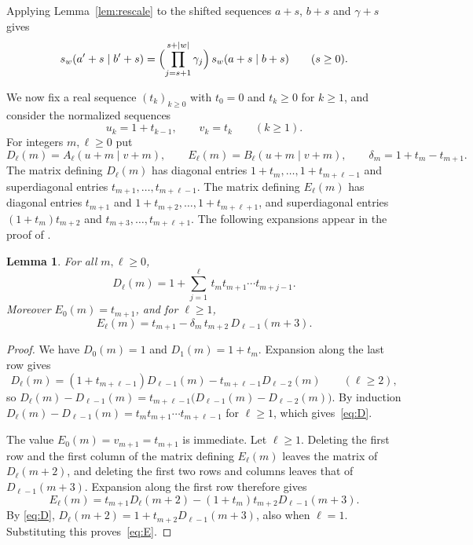 \documentclass[11pt]{amsart}
\newtheorem{lemma}[theorem]{Lemma}
\theoremstyle{definition}
\theoremstyle{remark}
\numberwithin{equation}{section}
\begin{document}
Applying Lemma~\ref{lem:rescale} to the shifted sequences $a+s$, $b+s$ and $\gamma+s$ gives
\begin{equation}\label{eq:rescale-shift}
s_w(a'+s\mid b'+s)=\Bigl(\prod_{j=s+1}^{s+|w|}\gamma_j\Bigr)\,s_w(a+s\mid b+s)\qquad(s\ge0).
\end{equation}

We now fix a real sequence $(t_k)_{k\ge0}$ with $t_0=0$ and $t_k\ge0$ for $k\ge1$, and consider the normalized sequences
\[
u_k=1+t_{k-1},\qquad v_k=t_k\qquad(k\ge1).
\]
For integers $m,\ell\ge0$ put
\[
D_\ell(m)=A_\ell(u+m\mid v+m),\qquad E_\ell(m)=B_\ell(u+m\mid v+m),\qquad \delta_m=1+t_m-t_{m+1}.
\]
The matrix defining $D_\ell(m)$ has diagonal entries $1+t_m,\dots,1+t_{m+\ell-1}$ and superdiagonal entries $t_{m+1},\dots,t_{m+\ell-1}$. The matrix defining $E_\ell(m)$ has diagonal entries $t_{m+1}$ and $1+t_{m+2},\dots,1+t_{m+\ell+1}$, and superdiagonal entries $(1+t_m)t_{m+2}$ and $t_{m+3},\dots,t_{m+\ell+1}$. The following expansions appear in the proof of \cite[Proposition~4.7]{PS26}.

\begin{lemma}\label{lem:expansions}
For all $m,\ell\ge0$,
\begin{equation}\label{eq:D}
D_\ell(m)=1+\sum_{j=1}^{\ell}\,t_mt_{m+1}\cdots t_{m+j-1}.
\end{equation}
Moreover $E_0(m)=t_{m+1}$, and for $\ell\ge1$,
\begin{equation}\label{eq:E}
E_\ell(m)=t_{m+1}-\delta_m\,t_{m+2}\,D_{\ell-1}(m+3).
\end{equation}
\end{lemma}

\begin{proof}
We have $D_0(m)=1$ and $D_1(m)=1+t_m$. Expansion along the last row gives
\[
D_\ell(m)=(1+t_{m+\ell-1})D_{\ell-1}(m)-t_{m+\ell-1}D_{\ell-2}(m)\qquad(\ell\ge2),
\]
so $D_\ell(m)-D_{\ell-1}(m)=t_{m+\ell-1}\bigl(D_{\ell-1}(m)-D_{\ell-2}(m)\bigr)$. By induction $D_\ell(m)-D_{\ell-1}(m)=t_mt_{m+1}\cdots t_{m+\ell-1}$ for $\ell\ge1$, which gives~\eqref{eq:D}.

The value $E_0(m)=v_{m+1}=t_{m+1}$ is immediate. Let $\ell\ge1$. Deleting the first row and the first column of the matrix defining $E_\ell(m)$ leaves the matrix of $D_\ell(m+2)$, and deleting the first two rows and columns leaves that of $D_{\ell-1}(m+3)$. Expansion along the first row therefore gives
\[
E_\ell(m)=t_{m+1}D_\ell(m+2)-(1+t_m)t_{m+2}D_{\ell-1}(m+3).
\]
By \eqref{eq:D}, $D_\ell(m+2)=1+t_{m+2}D_{\ell-1}(m+3)$, also when $\ell=1$. Substituting this proves~\eqref{eq:E}.
\end{proof}
\end{document}
